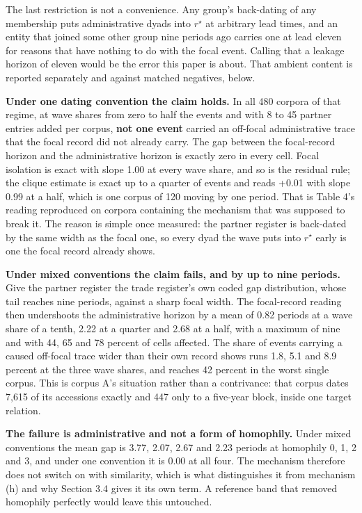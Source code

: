 \documentclass[twoside,11pt]{article}
\begin{document}
The last restriction is not a convenience. Any group's back-dating of any membership puts administrative dyads into \(r^{\star}\) at arbitrary lead times, and an entity that joined some other group nine periods ago carries one at lead eleven for reasons that have nothing to do with the focal event. Calling that a leakage horizon of eleven would be the error this paper is about. That ambient content is reported separately and against matched negatives, below.

\textbf{Under one dating convention the claim holds.} In all 480 corpora of that regime, at wave shares from zero to half the events and with 8 to 45 partner entries added per corpus, \textbf{not one event} carried an off-focal administrative trace that the focal record did not already carry. The gap between the focal-record horizon and the administrative horizon is exactly zero in every cell. Focal isolation is exact with slope 1.00 at every wave share, and so is the residual rule; the clique estimate is exact up to a quarter of events and reads +0.01 with slope 0.99 at a half, which is one corpus of 120 moving by one period. That is Table 4's reading reproduced on corpora containing the mechanism that was supposed to break it. The reason is simple once measured: the partner register is back-dated by the same width as the focal one, so every dyad the wave puts into \(r^{\star}\) early is one the focal record already shows.

\textbf{Under mixed conventions the claim fails, and by up to nine periods.} Give the partner register the trade register's own coded gap distribution, whose tail reaches nine periods, against a sharp focal width. The focal-record reading then undershoots the administrative horizon by a mean of 0.82 periods at a wave share of a tenth, 2.22 at a quarter and 2.68 at a half, with a maximum of nine and with 44, 65 and 78 percent of cells affected. The share of events carrying a caused off-focal trace wider than their own record shows runs 1.8, 5.1 and 8.9 percent at the three wave shares, and reaches 42 percent in the worst single corpus. This is corpus A's situation rather than a contrivance: that corpus dates 7,615 of its accessions exactly and 447 only to a five-year block, inside one target relation.

\textbf{The failure is administrative and not a form of homophily.} Under mixed conventions the mean gap is 3.77, 2.07, 2.67 and 2.23 periods at homophily 0, 1, 2 and 3, and under one convention it is 0.00 at all four. The mechanism therefore does not switch on with similarity, which is what distinguishes it from mechanism (h) and why Section 3.4 gives it its own term. A reference band that removed homophily perfectly would leave this untouched.
\end{document}
